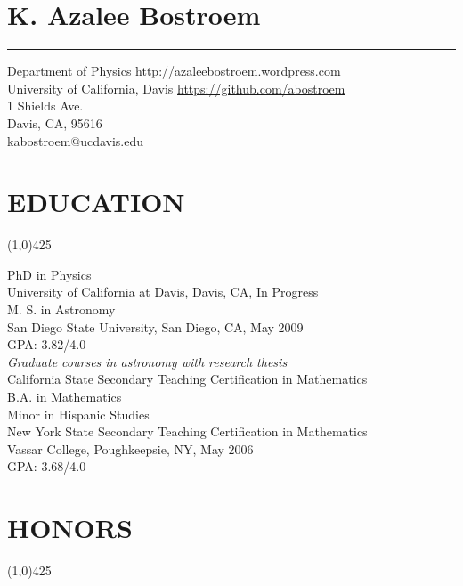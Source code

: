 \documentclass{res}
\begin{document}
 

\section{{\LARGE \bf{K. Azalee Bostroem}}}
{\rule{\linewidth}{0.5mm}}
Department of Physics \hfill {\color{blue}\url{http://azaleebostroem.wordpress.com}}\\
University of California, Davis \hfill {\color{blue}\url{https://github.com/abostroem} }\\
1 Shields Ave. \\
Davis, CA, 95616 \\
kabostroem@ucdavis.edu

\begin{resume}

\section{EDUCATION}
\vspace{-.2in} 
\begin{center}
\line(1,0){425}
\end{center}
\vspace{-.3in} 
\vspace{0.1in} 
 
   PhD in Physics \\
   University of California at Davis, Davis, CA, In Progress \\
 
    M. S. in Astronomy \\
    San Diego State University, San Diego, CA, May 2009 \\
    GPA: 3.82/4.0 \\
    \emph{Graduate courses in astronomy with research thesis} \\
    
    California State Secondary Teaching Certification in Mathematics \\
 
    B.A. in Mathematics \\
    Minor in Hispanic Studies \\
    New York State Secondary Teaching Certification in Mathematics \\
    Vassar College, Poughkeepsie, NY, May 2006\\
    GPA: 3.68/4.0   
 
\section{HONORS}
\vspace{-.2in} 
\begin{center}
\line(1,0){425}
\end{center}
\vspace{-.3in} 
\vspace{0.1in} 


\end{resume}
\end{document}
